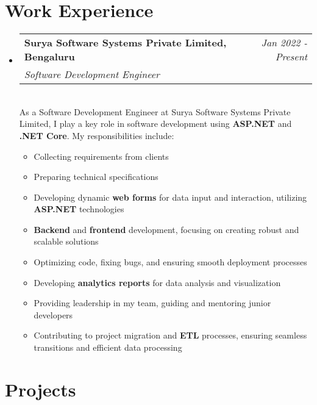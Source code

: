 \documentclass[a4paper,12pt]{article}
\makeatletter
\newcommand{\resumeSubHeadingListStart}{\begin{itemize}[leftmargin=*,labelsep=1mm,noitemsep]}
\newcommand{\resumeSubHeadingListEnd}{\end{itemize}\vspace{2mm}}
\newcommand{\resumeItemListStart}{\begin{itemize}[leftmargin=3ex, rightmargin=2ex, noitemsep,labelsep=1.2mm,itemsep=0mm]\small}
\newcommand{\resumeItemListEnd}{\end{itemize}\vspace{-2mm}}
\newcommand{\resumeExperience}[4]{
\vspace{0.5mm}\item
    \begin{tabular*}{0.98\textwidth}[t]{l@{\extracolsep{\fill}}r}
        \textbf{#1} & \textit{\footnotesize{#3}}\\
        \textit{\footnotesize{#2}} & {}
    \end{tabular*}\\ [1mm]
    \footnotesize{#4}
}
\newcommand{\emptyLine}{\\[-3mm]}
\makeatother
\begin{document}
\section{Work Experience}

\resumeSubHeadingListStart
\resumeExperience {Surya Software Systems Private Limited, Bengaluru}
 {Software Development Engineer} {Jan 2022 - Present}
{
As a Software Development Engineer at Surya Software Systems Private Limited, I play a key role in software development using \textbf{ASP.NET} and \textbf{.NET Core}. My responsibilities include:
}\emptyLine
\resumeItemListStart
    \item Collecting requirements from clients
    \item Preparing technical specifications
    \item Developing dynamic \textbf{web forms} for data input and interaction, utilizing \textbf{ASP.NET} technologies
    \item \textbf{Backend} and \textbf{frontend} development, focusing on creating robust and scalable solutions
    \item Optimizing code, fixing bugs, and ensuring smooth deployment processes
    \item Developing \textbf{analytics reports} for data analysis and visualization
    \item Providing leadership in my team, guiding and mentoring junior developers
    \item Contributing to project migration and \textbf{ETL} processes, ensuring seamless transitions and efficient data processing
    \resumeItemListEnd
\resumeSubHeadingListEnd

\section{Projects}
\end{document}
